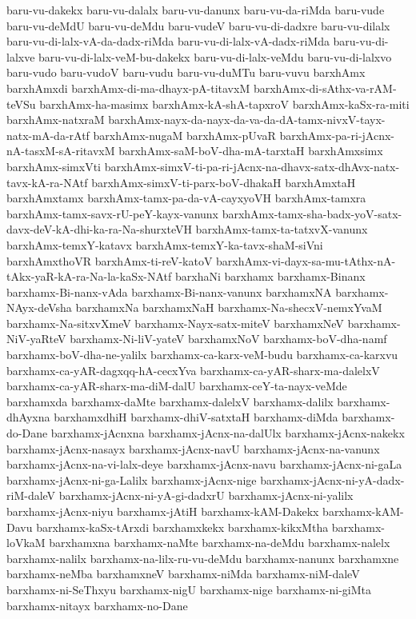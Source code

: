 {baru-vu-dakekx
baru-vu-dalalx
baru-vu-danunx
baru-vu-da-riMda
baru-vude
baru-vu-deMdU
baru-vu-deMdu
baru-vudeV
baru-vu-di-dadxre
baru-vu-dilalx
baru-vu-di-lalx-vA-da-dadx-riMda
baru-vu-di-lalx-vA-dadx-riMda
baru-vu-di-lalxve
baru-vu-di-lalx-veM-bu-dakekx
baru-vu-di-lalx-veMdu
baru-vu-di-lalxvo
baru-vudo
baru-vudoV
baru-vudu
baru-vu-duMTu
baru-vuvu
barxhAmx
barxhAmxdi
barxhAmx-di-ma-dhayx-pA-titavxM
barxhAmx-di-sAthx-va-rAM-teVSu
barxhAmx-ha-masimx
barxhAmx-kA-shA-tapxroV
barxhAmx-kaSx-ra-miti
barxhAmx-natxraM
barxhAmx-nayx-da-nayx-da-va-da-dA-tamx-nivxV-tayx-natx-mA-da-rAtf
barxhAmx-nugaM
barxhAmx-pUvaR
barxhAmx-pa-ri-jAcnx-nA-tasxM-sA-ritavxM
barxhAmx-saM-boV-dha-mA-tarxtaH
barxhAmxsimx
barxhAmx-simxVti
barxhAmx-simxV-ti-pa-ri-jAcnx-na-dhavx-satx-dhAvx-natx-tavx-kA-ra-NAtf
barxhAmx-simxV-ti-parx-boV-dhakaH
barxhAmxtaH
barxhAmxtamx
barxhAmx-tamx-pa-da-vA-cayxyoVH
barxhAmx-tamxra
barxhAmx-tamx-savx-rU-peY-kayx-vanunx
barxhAmx-tamx-sha-badx-yoV-satx-davx-deV-kA-dhi-ka-ra-Na-shurxteVH
barxhAmx-tamx-ta-tatxvX-vanunx
barxhAmx-temxY-katavx
barxhAmx-temxY-ka-tavx-shaM-siVni
barxhAmxthoVR
barxhAmx-ti-reV-katoV
barxhAmx-vi-dayx-sa-mu-tAthx-nA-tAkx-yaR-kA-ra-Na-la-kaSx-NAtf
barxhaNi
barxhamx
barxhamx-Binanx
barxhamx-Bi-nanx-vAda
barxhamx-Bi-nanx-vanunx
barxhamxNA
barxhamx-NAyx-deVsha
barxhamxNa
barxhamxNaH
barxhamx-Na-shecxV-nemxYvaM
barxhamx-Na-sitxvXmeV
barxhamx-Nayx-satx-miteV
barxhamxNeV
barxhamx-NiV-yaRteV
barxhamx-Ni-liV-yateV
barxhamxNoV
barxhamx-boV-dha-namf
barxhamx-boV-dha-ne-yalilx
barxhamx-ca-karx-veM-budu
barxhamx-ca-karxvu
barxhamx-ca-yAR-dagxqq-hA-cecxYva
barxhamx-ca-yAR-sharx-ma-dalelxV
barxhamx-ca-yAR-sharx-ma-diM-dalU
barxhamx-ceY-ta-nayx-veMde
barxhamxda
barxhamx-daMte
barxhamx-dalelxV
barxhamx-dalilx
barxhamx-dhAyxna
barxhamxdhiH
barxhamx-dhiV-satxtaH
barxhamx-diMda
barxhamx-do-Dane
barxhamx-jAcnxna
barxhamx-jAcnx-na-dalUlx
barxhamx-jAcnx-nakekx
barxhamx-jAcnx-nasayx
barxhamx-jAcnx-navU
barxhamx-jAcnx-na-vanunx
barxhamx-jAcnx-na-vi-lalx-deye
barxhamx-jAcnx-navu
barxhamx-jAcnx-ni-gaLa
barxhamx-jAcnx-ni-ga-Lalilx
barxhamx-jAcnx-nige
barxhamx-jAcnx-ni-yA-dadx-riM-daleV
barxhamx-jAcnx-ni-yA-gi-dadxrU
barxhamx-jAcnx-ni-yalilx
barxhamx-jAcnx-niyu
barxhamx-jAtiH
barxhamx-kAM-Dakekx
barxhamx-kAM-Davu
barxhamx-kaSx-tArxdi
barxhamxkekx
barxhamx-kikxMtha
barxhamx-loVkaM
barxhamxna
barxhamx-naMte
barxhamx-na-deMdu
barxhamx-nalelx
barxhamx-nalilx
barxhamx-na-lilx-ru-vu-deMdu
barxhamx-nanunx
barxhamxne
barxhamx-neMba
barxhamxneV
barxhamx-niMda
barxhamx-niM-daleV
barxhamx-ni-SeThxyu
barxhamx-nigU
barxhamx-nige
barxhamx-ni-giMta
barxhamx-nitayx
barxhamx-no-Dane
}
